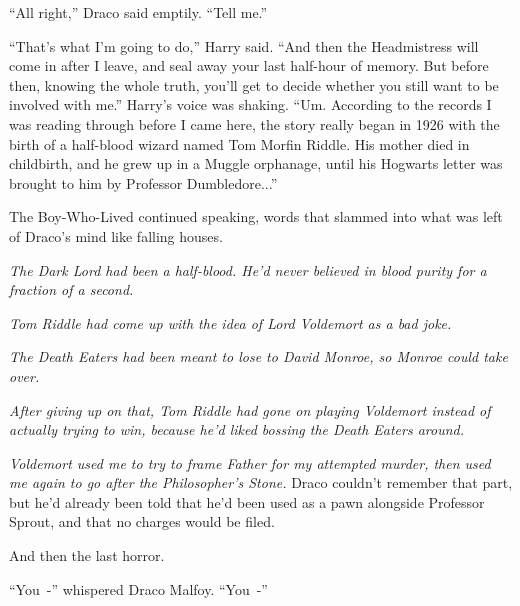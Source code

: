 ``All right,'' Draco said emptily. ``Tell me.''

``That's what I'm going to do,'' Harry said. ``And then the Headmistress will come in after I leave, and seal away your last half-hour of memory. But before then, knowing the whole truth, you'll get to decide whether you still want to be involved with me.'' Harry's voice was shaking. ``Um. According to the records I was reading through before I came here, the story really began in 1926 with the birth of a half-blood wizard named Tom Morfin Riddle. His mother died in childbirth, and he grew up in a Muggle orphanage, until his Hogwarts letter was brought to him by Professor Dumbledore...''

The Boy-Who-Lived continued speaking, words that slammed into what was left of Draco's mind like falling houses.

\emph{The Dark Lord had been a half-blood. He'd never believed in blood purity for a fraction of a second.}

\emph{Tom Riddle had come up with the idea of Lord Voldemort as a bad joke.}

\emph{The Death Eaters had been meant to lose to David Monroe, so Monroe could take over.}

\emph{After giving up on that, Tom Riddle had gone on playing Voldemort instead of actually trying to win, because he'd liked bossing the Death Eaters around.}

\emph{Voldemort used me to try to frame Father for my attempted murder, then used me again to go after the Philosopher's Stone.} Draco couldn't remember that part, but he'd already been told that he'd been used as a pawn alongside Professor Sprout, and that no charges would be filed.

And then the last horror.

``You~-'' whispered Draco Malfoy. ``You~-''

